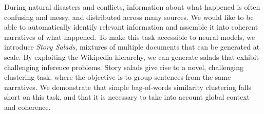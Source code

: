 During natural disasters and conflicts, information about what happened is often confusing and messy, and distributed across many sources. We would like to be able to automatically identify relevant information and assemble it into coherent narratives of what happened. To make this task accessible to neural models, we introduce \emph{Story Salads}, mixtures of multiple documents that can be generated at scale. By exploiting the Wikipedia hierarchy, we can generate salads that exhibit challenging inference problems. Story salads give rise to a novel, challenging clustering task, where the objective is to group sentences from the same narratives. We demonstrate that simple bag-of-words similarity clustering falls short on this task, and that it is necessary to take into account global context and coherence.
